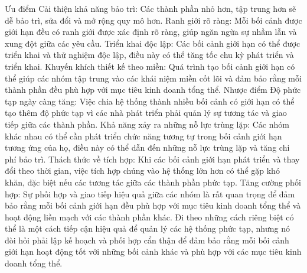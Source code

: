 Ưu điểm
Cải thiện khả năng bảo trì: Các thành phần nhỏ hơn, tập trung hơn sẽ dễ bảo trì, sửa đổi và mở rộng quy mô hơn.
Ranh giới rõ ràng: Mỗi bối cảnh được giới hạn đều có ranh giới được xác định rõ ràng, giúp ngăn ngừa sự nhầm lẫn và xung đột giữa các yêu cầu.
Triển khai độc lập: Các bối cảnh giới hạn có thể được triển khai và thử nghiệm độc lập, điều này có thể tăng tốc chu kỳ phát triển và triển khai.
Khuyến khích thiết kế theo miền: Quá trình tạo bối cảnh giới hạn có thể giúp các nhóm tập trung vào các khái niệm miền cốt lõi và đảm bảo rằng mỗi thành phần đều phù hợp với mục tiêu kinh doanh tổng thể.
Nhược điểm
Độ phức tạp ngày càng tăng: Việc chia hệ thống thành nhiều bối cảnh có giới hạn có thể tạo thêm độ phức tạp vì các nhà phát triển phải quản lý sự tương tác và giao tiếp giữa các thành phần.
Khả năng xảy ra những nỗ lực trùng lặp: Các nhóm khác nhau có thể cần phát triển chức năng tương tự trong bối cảnh giới hạn tương ứng của họ, điều này có thể dẫn đến những nỗ lực trùng lặp và tăng chi phí bảo trì.
Thách thức về tích hợp: Khi các bối cảnh giới hạn phát triển và thay đổi theo thời gian, việc tích hợp chúng vào hệ thống lớn hơn có thể gặp khó khăn, đặc biệt nếu các tương tác giữa các thành phần phức tạp.
Tăng cường phối hợp: Sự phối hợp và giao tiếp hiệu quả giữa các nhóm là rất quan trọng để đảm bảo rằng mỗi bối cảnh giới hạn đều phù hợp với mục tiêu kinh doanh tổng thể và hoạt động liền mạch với các thành phần khác.
Đi theo những cách riêng biệt có thể là một cách tiếp cận hiệu quả để quản lý các hệ thống phức tạp, nhưng nó đòi hỏi phải lập kế hoạch và phối hợp cẩn thận để đảm bảo rằng mỗi bối cảnh giới hạn hoạt động tốt với những bối cảnh khác và phù hợp với các mục tiêu kinh doanh tổng thể.

